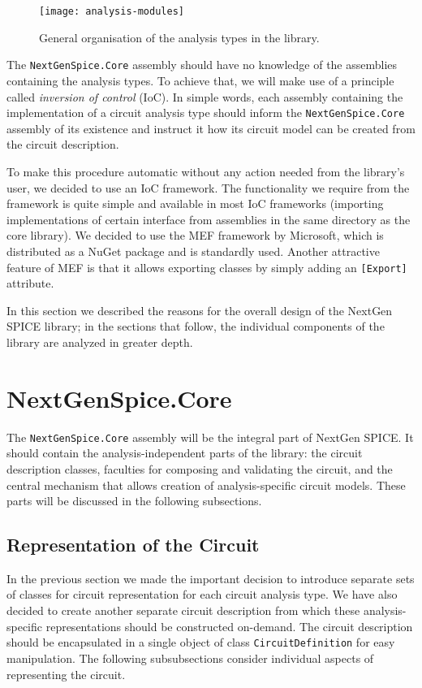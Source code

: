 \begin{figure}[h]
	\centering
	\texttt{[image: analysis-modules]}
	\caption{General organisation of the analysis types in the library.}
	\label{fig:library-modules}
\end{figure}

The \texttt{NextGenSpice.Core} assembly should have no knowledge of the assemblies containing the analysis types. To achieve that, we will make use of a principle called \textit{inversion of control} (IoC). In simple words, each assembly containing the implementation of a circuit analysis type should inform the \texttt{NextGenSpice.Core} assembly of its existence and instruct it how its circuit model can be created from the circuit description.

To make this procedure automatic without any action needed from the library's user, we decided to use an IoC framework. The functionality we require from the framework is quite simple and available in most IoC frameworks (importing implementations of certain interface from assemblies in the same directory as the core library). We decided to use the MEF framework \cite{mef} by Microsoft, which is distributed as a NuGet package and is standardly used. Another attractive feature of MEF is that it allows exporting classes by simply adding an \texttt{[Export]} attribute. 

In this section we described the reasons for the overall design of the NextGen SPICE library; in the sections that follow, the individual components of the library are analyzed in greater depth.

\section{NextGenSpice.Core}

The \texttt{NextGenSpice.Core} assembly will be the integral part of NextGen SPICE. It should contain the analysis-independent parts of the library: the circuit description classes, faculties for composing and validating the circuit, and the central mechanism that allows creation of analysis-specific circuit models. These parts will be discussed in the following subsections.

\subsection{Representation of the Circuit}
\label{fig:analysis:representation-circuit}
In the previous section we made the important decision to introduce separate sets of classes for circuit representation for each circuit analysis type. We have also decided to create another separate circuit description from which these analysis-specific representations should be constructed on-demand. The circuit description should be encapsulated in a single object of class \texttt{CircuitDefinition} for easy manipulation. The following subsubsections consider individual aspects of representing the circuit.

